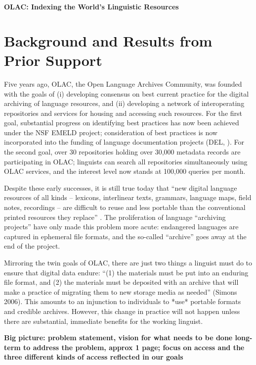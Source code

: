 \documentclass[11pt]{nsf}
\def\todo#1{\textbf{\large#1}}
\begin{document}
\begin{center}
\textbf{\Large
OLAC: Indexing the World's Linguistic Resources
}\end{center}

\section{Background and Results from Prior Support}

Five years ago, OLAC, the Open Language Archives Community, was
founded with the goals of (i) developing consensus on best current
practice for the digital archiving of language resources, and (ii)
developing a network of interoperating repositories and services for
housing and accessing such resources.  For the first goal, substantial
progress on identifying best practices has now been achieved under the
NSF EMELD project; consideration of best practices is now incorporated
into the funding of language documentation projects (DEL,
\citet{BirdSimons03language}).  For the second goal, over 30 repositories
holding over 30,000 metadata records are participating in OLAC;
linguists can search all repositories simultaneously using OLAC
services, and the interest level now stands at 100,000 queries per
month.

Despite these early successes, it is still true today that ``new
digital language resources of all kinds -- lexicons, interlinear
texts, grammars, language maps, field notes, recordings -- are
difficult to reuse and less portable than the conventional printed
resources they replace'' \citep{BirdSimons03language}.  The proliferation of
language ``archiving projects'' have only made this problem more
acute: endangered languages are captured in ephemeral file formats,
and the so-called ``archive'' goes away at the end of the project.

Mirroring the twin goals of OLAC, there are just two things a linguist
must do to ensure that digital data endure: ``(1) the materials must be
put into an enduring file format, and (2) the materials must be
deposited with an archive that will make a practice of migrating them
to new storage media as needed'' (Simons 2006).  This amounts to an
injunction to individuals to *use* portable formats and credible
archives.  However, this change in practice will not happen unless
there are substantial, immediate benefits for the working linguist.

\vspace{1in}

\todo{Big picture: problem statement, vision for what needs to be done
  long-term to address the problem, approx 1 page; focus on access and
  the three different kinds of access reflected in our goals}
\end{document}
